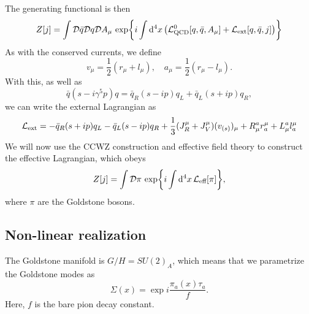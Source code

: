 The generating functional is then
\begin{equation}
    Z[j] 
    = 
    \int \mathcal{D} \bar q \mathcal{D} q \mathcal{D} A_\mu \, 
    \exp{
        i \int \dd^4 x 
        \left( 
            \mathcal{L}^0_\text{QCD}[q, \bar q, A_\mu] + \mathcal{L}_\text{ext}[q, \bar q, j]
        \right)
    }
\end{equation}
As with the conserved currents, we define
\begin{equation}
    v_\mu = \frac{1}{2}(r_\mu + l_\mu),
    \quad
    a_\mu = \frac{1}{2}(r_\mu - l_\mu).
\end{equation}
With this, as well as 
\begin{equation}
    \bar q (s - i \gamma^5 p) q
    = \bar q_R (s - i p) q_L + \bar q_L (s + i p) q_R,
\end{equation}
we can write the external Lagrangian as
\begin{equation}
    \mathcal{L}_\text{ext} 
    = - \bar q_R (s + i p) q_L - \bar q_L (s - i p) q_R
    + \frac{1}{3} (J_R^\mu + J_V^\mu)(v_{(s)})_\mu
    + R_\mu^a r^\mu_a + L_\mu^a l^\mu_a
\end{equation}
We will now use the CCWZ construction and effective field theory to construct the effective Lagrangian, which obeys
\begin{equation}
    Z[j] = \int \mathcal{D} \pi \, \exp{i \int \dd^4 x \, \mathcal{L}_\text{eff}[\pi]},
\end{equation}
where $\pi$ are the Goldstone bosons.

\subsection*{Non-linear realization}
The Goldstone manifold is $G/H = SU(2)_A$, which means that we parametrize the Goldstone modes as
\begin{equation}
    \Sigma(x) = \exp{i \frac{\pi_a(x) \tau_a}{f} }.
\end{equation}
Here, $f$ is the bare pion decay constant.

